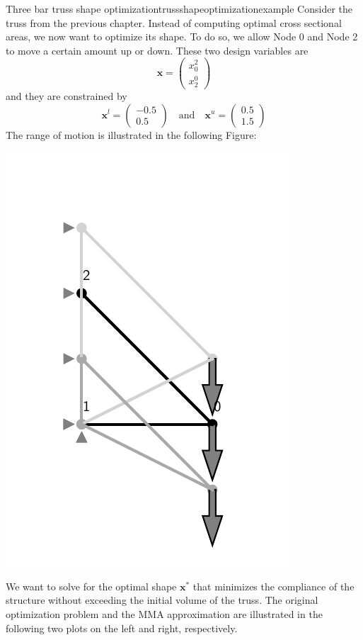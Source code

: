 \begin{example}{Three bar truss shape optimization}{trussshapeoptimizationexample}
    Consider the truss from the previous chapter. Instead of computing optimal cross sectional areas, we now want to optimize its shape. To do so, we allow Node 0 and Node 2 to move a certain amount up or down. These two design variables are 
    \begin{equation}
        \mathbf{x} = 
        \begin{pmatrix}
            x_0^2 \\ x_2^0
        \end{pmatrix}
    \end{equation}
    and they are constrained by 
    \begin{equation}
        \mathbf{x}^l = 
        \begin{pmatrix}
             -0.5\\ 0.5
        \end{pmatrix} 
        \quad 
        \text{and}
        \quad
        \mathbf{x}^u = 
        \begin{pmatrix}
             0.5\\ 1.5
        \end{pmatrix} 
    \end{equation}
    The range of motion is illustrated in the following Figure:
    \begin{center}
        \includegraphics[width=0.5\linewidth]{figures/three_bar_truss_shapes.pdf}
    \end{center}

    We want to solve for the optimal shape $\mathbf{x}^*$ that minimizes the compliance of the structure without exceeding the initial volume of the truss. The original optimization problem and the MMA approximation are illustrated in the following two plots on the left and right, respectively.


\end{example}
